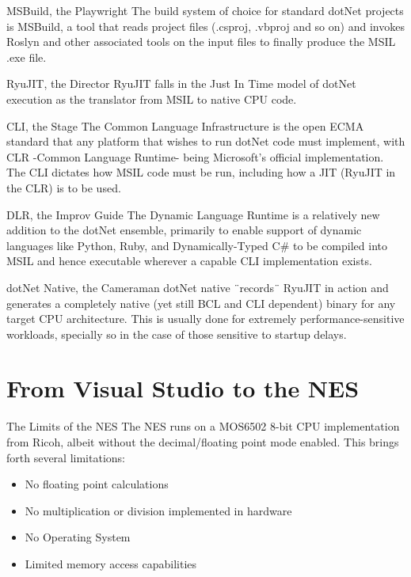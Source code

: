 \documentclass[10pt]{beamer}
\begin{document}
\begin{frame}{MSBuild, the Playwright}
The build system of choice for standard dotNet projects is MSBuild, a tool that reads project files (.csproj, .vbproj and so on) and invokes Roslyn and other associated tools on the input files to finally produce the MSIL .exe file.
\end{frame}

\begin{frame}{RyuJIT, the Director}
RyuJIT falls in the Just In Time model of dotNet execution as the translator from MSIL to native CPU code.
\end{frame}

\begin{frame}{CLI, the Stage}
The Common Language Infrastructure is the open ECMA standard that any platform that wishes to run dotNet code must implement, with CLR -Common Language Runtime- being Microsoft's official implementation. The CLI dictates how MSIL code must be run, including how a JIT (RyuJIT in the CLR) is to be used. 
\end{frame}

\begin{frame}{DLR, the Improv Guide}
The Dynamic Language Runtime is a relatively new addition to the dotNet ensemble, primarily to enable support of dynamic languages like Python, Ruby, and Dynamically-Typed C\# to be compiled into MSIL and hence executable wherever a capable CLI implementation exists.
\end{frame}

\begin{frame}{dotNet Native, the Cameraman}
dotNet native ¨records¨ RyuJIT in action and generates a completely native (yet still BCL and CLI dependent) binary for any target CPU architecture. This is usually done for extremely performance-sensitive workloads, specially so in the case of those sensitive to startup delays.
\end{frame}

\section{From Visual Studio to the NES}
\begin{frame}{The Limits of the NES}
The NES runs on a MOS6502 8-bit CPU implementation from Ricoh, albeit without the decimal/floating point mode enabled. This brings forth several limitations:
\begin{itemize}
    \item No floating point calculations
    \item No multiplication or division implemented in hardware
    \item No Operating System
    \item Limited memory access capabilities
\end{itemize}
\end{frame}
\end{document}
